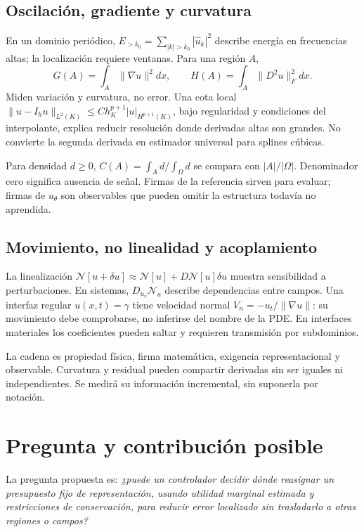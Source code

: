 \subsection{Oscilación, gradiente y curvatura}
En un dominio periódico, $E_{>k_0}=\sum_{|k|>k_0}|\widehat u_k|^2$ describe energía en frecuencias altas; la localización requiere ventanas. Para una región $A$,
\begin{equation}G(A)=\int_A\|\nabla u\|^2dx,\qquad H(A)=\int_A\|D^2u\|_F^2dx.\end{equation}
Miden variación y curvatura, no error. Una cota local $\|u-I_hu\|_{L^2(K)}\leq Ch_K^{p+1}|u|_{H^{p+1}(K)}$, bajo regularidad y condiciones del interpolante, explica reducir resolución donde derivadas altas son grandes. No convierte la segunda derivada en estimador universal para splines cúbicas.

Para densidad $d\geq0$, $C(A)=\int_A d/\int_\Omega d$ se compara con $|A|/|\Omega|$. Denominador cero significa ausencia de señal. Firmas de la referencia sirven para evaluar; firmas de $u_\theta$ son observables que pueden omitir la estructura todavía no aprendida.
\subsection{Movimiento, no linealidad y acoplamiento}
La linealización $\mathcal N[u+\delta u]\approx\mathcal N[u]+D\mathcal N[u]\delta u$ muestra sensibilidad a perturbaciones. En sistemas, $D_{u_v}\mathcal N_a$ describe dependencias entre campos. Una interfaz regular $u(x,t)=\gamma$ tiene velocidad normal $V_n=-u_t/\|\nabla u\|$: su movimiento debe comprobarse, no inferirse del nombre de la PDE. En interfaces materiales los coeficientes pueden saltar y requieren transmisión por subdominios.

La cadena es propiedad física, firma matemática, exigencia representacional y observable. Curvatura y residual pueden compartir derivadas sin ser iguales ni independientes. Se medirá su información incremental, sin suponerla por notación.

\section{Pregunta y contribución posible}
La pregunta propuesta es: \emph{¿puede un controlador decidir dónde reasignar un presupuesto fijo de representación, usando utilidad marginal estimada y restricciones de conservación, para reducir error localizado sin trasladarlo a otras regiones o campos?}

